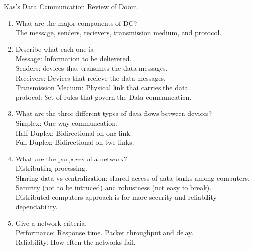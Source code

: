 
\begin{center}
    Kas's Data Communcation Review of Doom.
\end{center}


\begin{enumerate}
    \item What are the major components of DC?\\
          The message, senders, recievers, transmission medium, and protocol.

    \item Describe what each one is.\\
          Message: Information to be delievered.\\
          Senders: devices that transmits the data messages.\\
          Receivers: Devices that recieve the data messages.\\
          Transmission Medium: Physical link that carries the data.\\
          protocol: Set of rules that govern the Data communcation.\\

    \item What are the three different types of data flows between devices?\\
          Simplex: One way communcation.\\
          Half Duplex: Bidirectional on one link.\\
          Full Duplex: Bidirectional on two links.\\

    \item What are the purposes of a network?\\
          Distributing processing.\\
          Sharing data vs centralization: shared access of data-banks among computers.\\
          Security (not to be intruded) and robustness (not easy to break).\\

          Distributed computers approach is for more security and reliability dependability.\\

    \item Give a network criteria.\\
          Performance: Response time. Packet throughput and delay.\\

          Reliability: How often the networks fail.\\


\end{enumerate}
